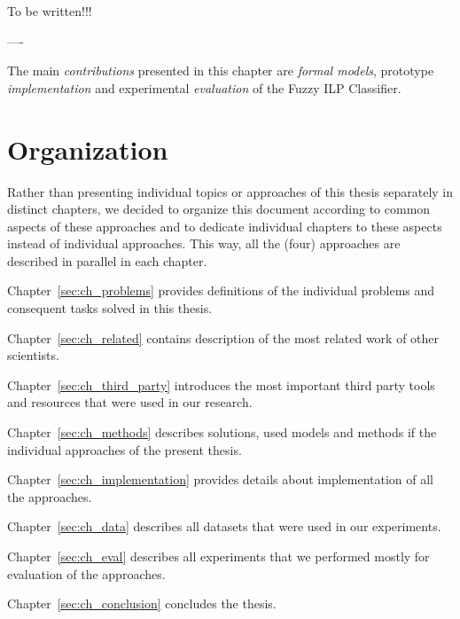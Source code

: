 To be written!!!

----

The main \emph{contributions} presented in this chapter are \emph{formal models}, prototype \emph{implementation} and experimental \emph{evaluation} of the Fuzzy ILP Classifier.



\section{Organization}

Rather than presenting individual topics or approaches of this thesis separately in distinct chapters, we decided to organize this document according to common aspects of these approaches and to dedicate individual chapters to these aspects instead of individual approaches. This way, all the (four) approaches are described in parallel in each chapter. 

Chapter~\ref{sec:ch_problems} provides definitions of the individual problems and consequent tasks solved in this thesis.

Chapter~\ref{sec:ch_related} contains description of the most related work of other scientists.

Chapter~\ref{sec:ch_third_party} introduces the most important third party tools and resources that were used in our research.

Chapter~\ref{sec:ch_methods} describes solutions, used models and methods if the individual approaches of the present thesis.

Chapter~\ref{sec:ch_implementation} provides details about implementation of all the approaches.

Chapter~\ref{sec:ch_data} describes all datasets that were used in our experiments.

Chapter~\ref{sec:ch_eval} describes all experiments that we performed mostly for evaluation of the approaches.

Chapter~\ref{sec:ch_conclusion} concludes the thesis.

